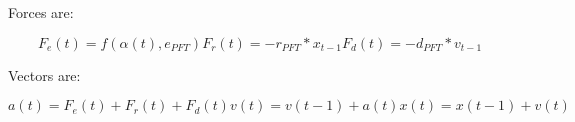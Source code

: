 Forces are:

\begin{equation}
    F_e(t) = f(\alpha(t), e_{PFT})
    F_r(t) = -r_{PFT}*x_{t-1}
    F_d(t) = -d_{PFT}*v_{t-1}
\end{equation}

Vectors are:

\begin{equation}
    a(t) = F_e(t) + F_r(t) + F_d(t)
    v(t) = v(t-1) + a(t)
    x(t) = x(t-1) + v(t)
\end{equation}

